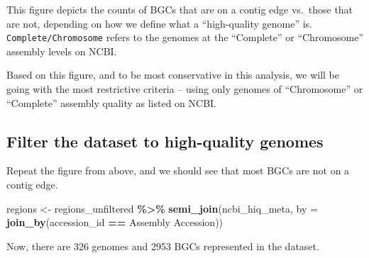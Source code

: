 \documentclass[
]{article}
\newenvironment{Shaded}{\begin{snugshade}}{\end{snugshade}}
\newcommand{\AttributeTok}[1]{\textcolor[rgb]{0.13,0.29,0.53}{#1}}
\newcommand{\FunctionTok}[1]{\textcolor[rgb]{0.13,0.29,0.53}{\textbf{#1}}}
\newcommand{\NormalTok}[1]{#1}
\newcommand{\OtherTok}[1]{\textcolor[rgb]{0.56,0.35,0.01}{#1}}
\newcommand{\SpecialCharTok}[1]{\textcolor[rgb]{0.81,0.36,0.00}{\textbf{#1}}}
\newcommand{\StringTok}[1]{\textcolor[rgb]{0.31,0.60,0.02}{#1}}
\begin{document}
This figure depicts the counts of BGCs that are on a contig edge
vs.~those that are not, depending on how we define what a ``high-quality
genome'' is. \texttt{Complete/Chromosome} refers to the genomes at the
``Complete'' or ``Chromosome'' assembly levels on NCBI.

Based on this figure, and to be most conservative in this analysis, we
will be going with the most restrictive criteria -- using only genomes
of ``Chromosome'' or ``Complete'' assembly quality as listed on NCBI.

\hypertarget{filter-the-dataset-to-high-quality-genomes}{%
\subsection{Filter the dataset to high-quality
genomes}\label{filter-the-dataset-to-high-quality-genomes}}

Repeat the figure from above, and we should see that most BGCs are not
on a contig edge.

\begin{Shaded}
\begin{Highlighting}[]
\NormalTok{regions }\OtherTok{\textless{}{-}}\NormalTok{ regions\_unfiltered }\SpecialCharTok{\%\textgreater{}\%}
  \FunctionTok{semi\_join}\NormalTok{(ncbi\_hiq\_meta, }\AttributeTok{by =} \FunctionTok{join\_by}\NormalTok{(accession\_id }\SpecialCharTok{==} \StringTok{\textasciigrave{}}\AttributeTok{Assembly Accession}\StringTok{\textasciigrave{}}\NormalTok{))}
\end{Highlighting}
\end{Shaded}

Now, there are 326 genomes and 2953 BGCs represented in the dataset.
\end{document}
